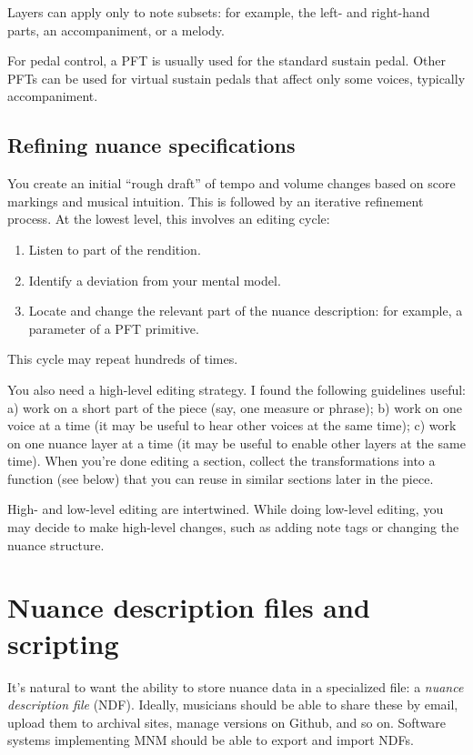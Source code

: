 \documentclass[letterpaper, 12pt]{article}
\begin{document}
Layers can apply only to note subsets:
for example, the left- and right-hand parts,
an accompaniment, or a melody.

For pedal control, a PFT is usually used for the standard sustain pedal.
Other PFTs can be used for virtual sustain pedals that affect only some voices,
typically accompaniment.

\subsection{Refining nuance specifications}

You create an initial ``rough draft''
of tempo and volume changes based on score markings and
musical intuition.
This is followed by an iterative refinement process.
At the lowest level, this involves an editing cycle:
\begin{enumerate}
\item Listen to part of the rendition.
\item Identify a deviation from your mental model.
\item Locate and change the relevant part of the nuance description:
for example, a parameter of a PFT primitive.
\end{enumerate}

This cycle may repeat hundreds of times.

You also need a high-level editing strategy.
I found the following guidelines useful:
a) work on a short part of the piece (say, one measure or phrase);
b) work on one voice at a time
(it may be useful to hear other voices at the same time);
c) work on one nuance layer at a time
(it may be useful to enable other layers at the same time).
When you're done editing a section,
collect the transformations into a function (see below)
that you can reuse in similar sections later in the piece.

High- and low-level editing are intertwined.
While doing low-level editing,
you may decide to make high-level changes,
such as adding note tags or changing the nuance structure.

\section{Nuance description files and scripting}

It's natural to want the ability to store nuance data in a specialized file:
a \textit{nuance description file} (NDF).
Ideally, musicians should be able to share these by email,
upload them to archival sites,
manage versions on Github, and so on.
Software systems implementing MNM should be able to
export and import NDFs.
\end{document}
